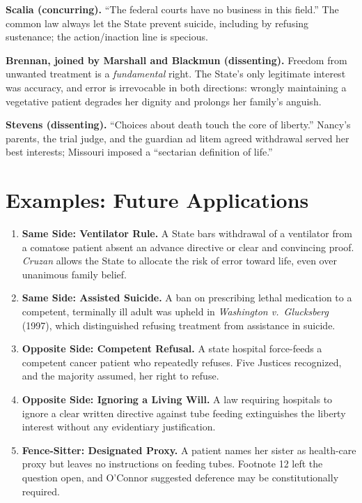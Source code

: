 \documentclass[12pt]{article}
\begin{document}
\textbf{Scalia (concurring).} ``The federal courts have no business in this field.'' The common law always let the State prevent suicide, including by refusing sustenance; the action/inaction line is specious.

\textbf{Brennan, joined by Marshall and Blackmun (dissenting).} Freedom from unwanted treatment is a \textit{fundamental} right. The State's only legitimate interest was accuracy, and error is irrevocable in both directions: wrongly maintaining a vegetative patient degrades her dignity and prolongs her family's anguish.

\textbf{Stevens (dissenting).} ``Choices about death touch the core of liberty.'' Nancy's parents, the trial judge, and the guardian ad litem agreed withdrawal served her best interests; Missouri imposed a ``sectarian definition of life.''

\section{Examples: Future Applications}

\begin{enumerate}
\item \textbf{Same Side: Ventilator Rule.} A State bars withdrawal of a ventilator from a comatose patient absent an advance directive or clear and convincing proof. \textit{Cruzan} allows the State to allocate the risk of error toward life, even over unanimous family belief.
\item \textbf{Same Side: Assisted Suicide.} A ban on prescribing lethal medication to a competent, terminally ill adult was upheld in \textit{Washington v.\ Glucksberg} (1997), which distinguished refusing treatment from assistance in suicide.
\item \textbf{Opposite Side: Competent Refusal.} A state hospital force-feeds a competent cancer patient who repeatedly refuses. Five Justices recognized, and the majority assumed, her right to refuse.
\item \textbf{Opposite Side: Ignoring a Living Will.} A law requiring hospitals to ignore a clear written directive against tube feeding extinguishes the liberty interest without any evidentiary justification.
\item \textbf{Fence-Sitter: Designated Proxy.} A patient names her sister as health-care proxy but leaves no instructions on feeding tubes. Footnote 12 left the question open, and O'Connor suggested deference may be constitutionally required.
\end{enumerate}
\end{document}
